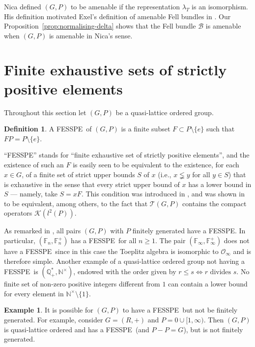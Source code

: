 \documentclass[12pt]{amsart}
\theoremstyle{plain}
\theoremstyle{remark}
\theoremstyle{definition}
\numberwithin{equation}{section}
\theoremstyle{plain}
\theoremstyle{definition}
\newtheorem{defn}[theorem]{Definition}
\newtheorem{ex}[theorem]{Example}
\theoremstyle{remark}
\begin{document}
Nica \cite[Definition 4.2]{N} defined $(G, P)$ to be amenable if  the representation $\lambda_T$
is an isomorphism. His definition motivated
Exel's definition of amenable Fell bundles in \cite{E}. Our
Proposition~\ref{prop:normalising-delta} shows that the Fell bundle $\mathcal{B}$ is
amenable when   $(G, P)$ is amenable in Nica's sense.

\section{Finite exhaustive sets of strictly positive elements}\label{section:fessub}

Throughout this section let $(G,P)$ be a quasi-lattice ordered group.

\begin{defn}
A {FESSPE}\ of $(G,P)$ is a finite subset $F\subset P{\setminus}\{e\}$ such that $FP=P{\setminus}\{e\}$.
\end{defn}

``{FESSPE}'' stands for ``finite exhaustive set of strictly positive elements'', and the existence of such an $F$ is easily seen to be equivalent to the existence, for each $x\in G$, of a finite set of strict upper bounds $S$ of $x$ (i.e., $x\lneqq y$ for all $y\in S$) that is exhaustive in the sense that every strict upper bound of $x$
has a lower bound in $S$ --- namely, take $S=xF$.
This condition was introduced
in \cite{N}, and was shown in
\cite[Proposition 6.3]{N} to be equivalent, among others, to the fact that ${\mathcal T}(G,P)$
contains the compact operators ${\mathcal K}(l^2(P))$.

As remarked in \cite{N}, all pairs $(G,P)$ with $P$ finitely generated have a {FESSPE}. In particular,
$({{\mathbb{{F}}}}_n, {{\mathbb{{F}}}}_n^+)$ has a {FESSPE}\ for all $n\geq 1$. The pair $({{\mathbb{{F}}}}_\infty, {{\mathbb{{F}}}}_\infty^+)$
does not have a {FESSPE}\ since in this case the Toeplitz algebra is isomorphic to ${\mathcal O}_\infty$ and is therefore simple.
Another example of
a quasi-lattice ordered group not having a {FESSPE}\ is $({{\mathbb{{Q}}}}_+^*, {{\mathbb{{N}}}}^\times)$, endowed with the order given by
$r\leq s {\ensuremath{\Leftrightarrow}} r \text{ divides }s$. No finite set of non-zero positive integers different from $1$
can contain a lower bound for every element in ${{\mathbb{{N}}}}^\times\setminus\{1\}$.

\begin{ex}
It is possible for $(G,P)$ to have a {FESSPE}\ but not be finitely generated.
For example,
consider $G = (R,+)$ and
$P={0}\cup[1,\infty)$.  Then $(G,P)$ is quasi-lattice ordered and has a {FESSPE}\ (and $P-P=G$), but
is not finitely generated.
\end{ex}
\end{document}

